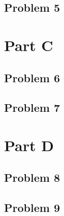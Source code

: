 \documentclass[11pt]{article}
\begin{document}
\subsection*{Problem 5}

\section*{Part C}

\subsection*{Problem 6}

\subsection*{Problem 7}

\section*{Part D}

\subsection*{Problem 8}

\subsection*{Problem 9}
\end{document}
